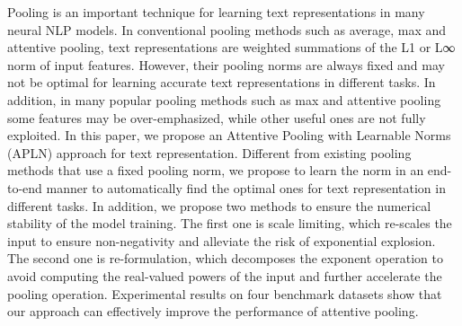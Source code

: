 Pooling is an important technique for learning text representations in many neural NLP models. In conventional pooling methods such as average, max and attentive pooling, text representations are weighted summations of the L1 or L∞ norm of input features. However, their pooling norms are always fixed and may not be optimal for learning accurate text representations in different tasks. In addition, in many popular pooling methods such as max and attentive pooling some features may be over-emphasized, while other useful ones are not fully exploited. In this paper, we propose an Attentive Pooling with Learnable Norms (APLN) approach for text representation. Different from existing pooling methods that use a fixed pooling norm, we propose to learn the norm in an end-to-end manner to automatically find the optimal ones for text representation in different tasks. In addition,  we propose two methods to ensure the numerical stability of the model training. The first one is scale limiting, which re-scales the input to ensure non-negativity and alleviate the risk of exponential explosion. The second one is re-formulation, which decomposes the exponent operation to avoid computing the real-valued powers of the input and further accelerate the pooling operation. Experimental results on four benchmark datasets show that our approach can effectively improve the performance of attentive pooling.
